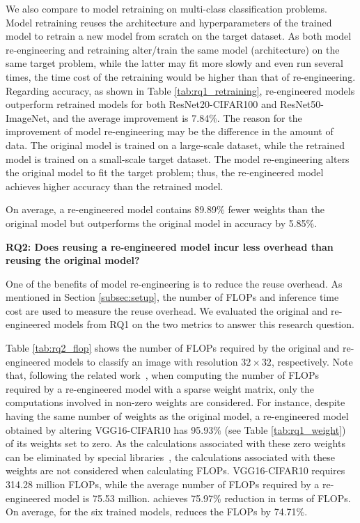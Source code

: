 
We also compare \projectName to model retraining on multi-class classification problems.
Model retraining reuses the architecture and hyperparameters of the trained model to retrain a new model from scratch on the target dataset.
As both model re-engineering and retraining alter/train the same model (architecture) on the same target problem, while the latter may fit more slowly and even run several times, the time cost of the retraining would be higher than that of re-engineering.
Regarding accuracy, as shown in Table \ref{tab:rq1_retraining},
re-engineered models outperform retrained models for both ResNet20-CIFAR100 and ResNet50-ImageNet, and the average improvement is 7.84\%.
The reason for the improvement of model re-engineering may be the difference in the amount of data.
The original model is trained on a large-scale dataset, while the retrained model is trained on a small-scale target dataset.
The model re-engineering alters the original model to fit the target problem; thus, the re-engineered model achieves higher accuracy than the retrained model.



\begin{tcolorbox}[left=2pt,right=2pt,top=2pt,bottom=2pt]
On average, a re-engineered model contains 89.89\% fewer weights than the original model but outperforms the original model in accuracy by 5.85\%.
\end{tcolorbox}





\noindent \textbf{RQ2: Does reusing a re-engineered model incur less overhead than reusing the original model?}
\label{subsec:results:rq2}

One of the benefits of model re-engineering is to reduce the reuse overhead.
As mentioned in Section \ref{subsec:setup}, the number of FLOPs and inference time cost are used to measure the reuse overhead.
We evaluated the original and re-engineered models from RQ1 on the two metrics to answer this research question.

Table \ref{tab:rq2_flop} shows the number of FLOPs required by the original and re-engineered models to classify an image with resolution $32{\times}32$, respectively.
Note that, following the related work~\cite{pruning_hansong,louizos2018learning}, when computing the number of FLOPs required by a re-engineered model with a sparse weight matrix, only the computations involved in non-zero weights are considered.
For instance, despite having the same number of weights as the original model, a re-engineered model obtained by altering VGG16-CIFAR10 has 95.93\% (see Table \ref{tab:rq1_weight}) of its weights set to zero.
As the calculations associated with these zero weights can be eliminated by special libraries~\cite{han2016eie}, the calculations associated with these weights are not considered when calculating FLOPs.
VGG16-CIFAR10 requires 314.28 million FLOPs, while the average number of FLOPs required by a re-engineered model is 75.53 million. 
\projectName achieves 75.97\% reduction in terms of FLOPs.
On average, for the six trained models, \projectName reduces the FLOPs by 74.71\%.






